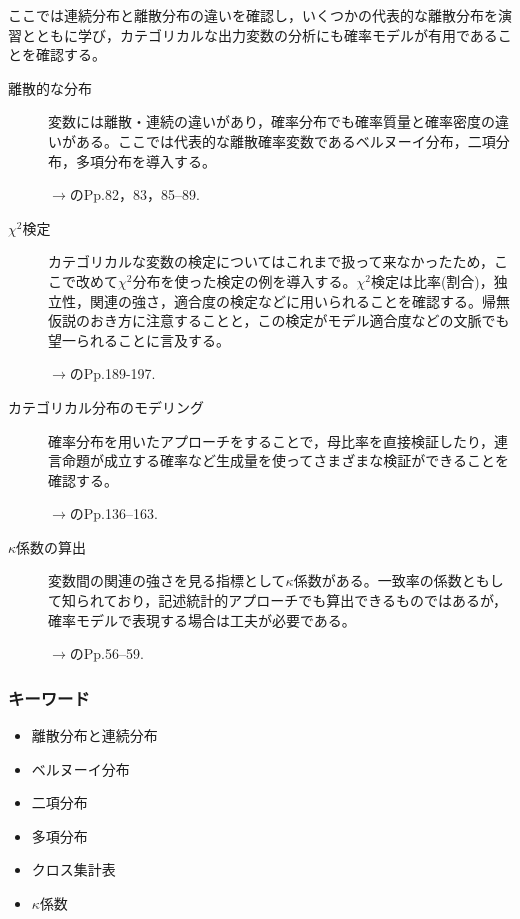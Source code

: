 ここでは連続分布と離散分布の違いを確認し，いくつかの代表的な離散分布を演習とともに学び，カテゴリカルな出力変数の分析にも確率モデルが有用であることを確認する。
\begin{description}
	\item[離散的な分布] 変数には離散・連続の違いがあり，確率分布でも確率質量と確率密度の違いがある。ここでは代表的な離散確率変数であるベルヌーイ分布，二項分布，多項分布を導入する。

	      \begin{flushright}
		      $\to$\citet{Matsuura201610}のPp.82，83，85--89.
	      \end{flushright}


	\item[$\chi^2$検定] カテゴリカルな変数の検定についてはこれまで扱って来なかったため，ここで改めて$\chi^2$分布を使った検定の例を導入する。$\chi^2$検定は比率(割合)，独立性，関連の強さ，適合度の検定などに用いられることを確認する。帰無仮説のおき方に注意することと，この検定がモデル適合度などの文脈でも望一られることに言及する。

	      \begin{flushright}
		      $\to$\citet{Yamauchi201001}のPp.189-197.
	      \end{flushright}


	\item[カテゴリカル分布のモデリング] 確率分布を用いたアプローチをすることで，母比率を直接検証したり，連言命題が成立する確率など生成量を使ってさまざまな検証ができることを確認する。

	      \begin{flushright}
		      $\to$\citet{Toyoda201606}のPp.136--163.
	      \end{flushright}

	\item[$\kappa$係数の算出] 変数間の関連の強さを見る指標として$\kappa$係数がある。一致率の係数ともして知られており，記述統計的アプローチでも算出できるものではあるが，確率モデルで表現する場合は工夫が必要である。

	      \begin{flushright}
		      $\to$\citet{Lee201709}のPp.56--59.
	      \end{flushright}

\end{description}
\subsubsection{キーワード}
\begin{itemize}
	\item 離散分布と連続分布
	\item ベルヌーイ分布
	\item 二項分布
	\item 多項分布
	\item クロス集計表
	\item $\kappa$係数
\end{itemize}

